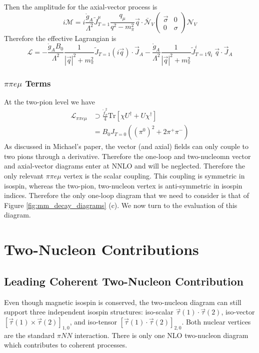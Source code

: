 \documentclass{book}[12pt]
\begin{document}
 Then the amplitude for the axial-vector process is
\begin{equation}
i\mathcal{M}=i\frac{\mathring{g}_A}{\Lambda^2}\tilde{J}^{\mu}_{T=1}\frac{q_{\mu}}{q^2-m_{\pi}^2}\vec{q}\cdot\bar{\mathcal{N}}_V\left(\begin{array}{cc}
\vec{\sigma} & 0\\
0 &\sigma
\end{array}\right)\mathcal{N}_V
\end{equation}
Therefore the effective Lagrangian is
\begin{equation}
\mathcal{L}=-\frac{\mathring{g}_AB_0}{\Lambda^2}\frac{1}{|\vec{q}|^2+m_{\pi}^2}\tilde{J}_{T=1}(i\vec{q})\cdot\vec{J}_A-\frac{\mathring{g}_A}{\Lambda^2}\frac{1}{|\vec{q}|^2+m_{\pi}^2}\tilde{J}^i_{T=1}q_i\;\vec{q}\cdot \vec{J}_A
\end{equation}
\subsection{$\pi \pi e\mu$ Terms}
At the two-pion level we have
\begin{equation}
\begin{split}
\mathcal{L}_{\pi\pi e\mu}&\supset \frac{\mathring{f}_{\pi}^2}{4}\mathrm{Tr}\left[\chi U^{\dag}+U\chi^{\dag}\right]\\
&=B_0 J_{T=0}\left((\pi^0)^2+2\pi^+\pi^-\right)
\end{split}
\end{equation}
As discussed in Michael's paper, the vector (and axial) fields can only couple to two pions through a derivative. Therefore the one-loop and two-nucleomn vector and axial-vector diagrams enter at NNLO and will be neglected. Therefore the only relevant $\pi\pi e\mu$ vertex is the scalar coupling. This coupling is symmetric in isospin, whereas the two-pion, two-nucleon vertex is anti-symmetric in isospin indices. Therefore the only one-loop diagram that we need to consider is that of Figure \ref{fig:mm_decay_diagrams} (c). We now turn to the evaluation of this diagram.
\chapter{Two-Nucleon Contributions}
\section{Leading Coherent Two-Nucleon Contribution}
Even though magnetic isospin is conserved, the two-nucleon diagram can still support three independent isospin structures: iso-scalar $\vec{\tau}(1)\cdot\vec{\tau}(2)$, iso-vector $\left[\vec{\tau}(1)\times\vec{\tau}(2)\right]_{1,0}$, and iso-tensor $\left[\vec{\tau}(1)\cdot\vec{\tau}(2)\right]_{2,0}$. Both nuclear vertices are the standard $\pi NN$ interaction. There is only one NLO two-nucleon diagram which contributes to coherent processes. 
\end{document}
